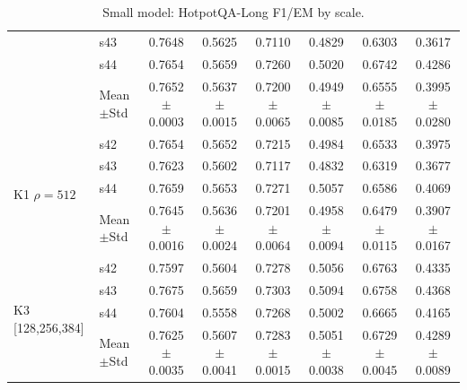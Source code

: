 \begin{table}[t]
\begin{tabular}{llcccccc}
 & s43 & 0.7648 & 0.5625 & 0.7110 & 0.4829 & 0.6303 & 0.3617 \\
 & s44 & 0.7654 & 0.5659 & 0.7260 & 0.5020 & 0.6742 & 0.4286 \\
 & Mean$\pm$Std & 0.7652$\pm$0.0003 & 0.5637$\pm$0.0015 & 0.7200$\pm$0.0065 & 0.4949$\pm$0.0085 & 0.6555$\pm$0.0185 & 0.3995$\pm$0.0280 \\
\midrule
\multirow{4}{*}{K1 $\rho{=}512$} & s42 & 0.7654 & 0.5652 & 0.7215 & 0.4984 & 0.6533 & 0.3975 \\
 & s43 & 0.7623 & 0.5602 & 0.7117 & 0.4832 & 0.6319 & 0.3677 \\
 & s44 & 0.7659 & 0.5653 & 0.7271 & 0.5057 & 0.6586 & 0.4069 \\
 & Mean$\pm$Std & 0.7645$\pm$0.0016 & 0.5636$\pm$0.0024 & 0.7201$\pm$0.0064 & 0.4958$\pm$0.0094 & 0.6479$\pm$0.0115 & 0.3907$\pm$0.0167 \\
\midrule
\multirow{4}{*}{K3 [128,256,384]} & s42 & 0.7597 & 0.5604 & 0.7278 & 0.5056 & 0.6763 & 0.4335 \\
 & s43 & 0.7675 & 0.5659 & 0.7303 & 0.5094 & 0.6758 & 0.4368 \\
 & s44 & 0.7604 & 0.5558 & 0.7268 & 0.5002 & 0.6665 & 0.4165 \\
 & Mean$\pm$Std & 0.7625$\pm$0.0035 & 0.5607$\pm$0.0041 & 0.7283$\pm$0.0015 & 0.5051$\pm$0.0038 & 0.6729$\pm$0.0045 & 0.4289$\pm$0.0089 \\
\bottomrule
\end{tabular}
\caption{Small model: HotpotQA-Long F1/EM by scale.}
\label{tab:appendix_small_hotpot}
\end{table}

